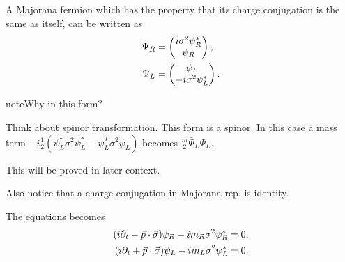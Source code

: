 \documentclass[letterpaper,12pt,english]{sphinxmanual}
\begin{document}
A Majorana fermion which has the property that its charge conjugation is the same as itself, can be written as
\begin{gather}
\begin{split}\Psi_R &= \begin{pmatrix}  i \sigma^2 \psi_R^* \\ \psi_R  \end{pmatrix}, \\
\Psi_L & = \begin{pmatrix} \psi_L \\  -i\sigma^2\psi_L^* \end{pmatrix}.\end{split}\notag
\end{gather}
\begin{notice}{note}{Why in this form?}

Think about spinor transformation. This form is a spinor. In this case a mass term \(-i\frac{1}{2}( \psi_L^\dagger \sigma^2 \psi_L^* - \psi_L^T \sigma^2 \psi_L )\) becomes \(\frac{m}{2}\bar\Psi_L\Psi_L\).

This will be proved in later context.

Also notice that a charge conjugation in Majorana rep. is identity.
\end{notice}

The equations becomes
\begin{gather}
\begin{split}(i\partial_t -\vec p \cdot \vec \sigma) \psi_R - i m_R \sigma^2 \psi_R^* &= 0, \\
(i\partial_t + \vec p \cdot \vec \sigma) \psi_L - i m_L \sigma^2\psi_L^* & = 0.\end{split}\notag
\end{gather}
\end{document}
